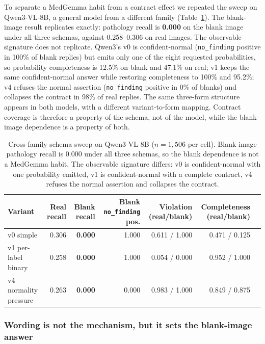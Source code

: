 To separate a MedGemma habit from a contract effect we repeated the sweep on Qwen3-VL-8B, a general model from a different family (Table~\ref{tab:r2xfamily}). The blank-image result replicates exactly: pathology recall is \textbf{0.000} on the blank image under all three schemas, against 0.258--0.306 on real images. The observable signature does not replicate. Qwen3's v0 is confident-normal (\texttt{no\_finding} positive in 100\% of blank replies) but emits only one of the eight requested probabilities, so probability completeness is 12.5\% on blank and 47.1\% on real; v1 keeps the same confident-normal answer while restoring completeness to 100\% and 95.2\%; v4 refuses the normal assertion (\texttt{no\_finding} positive in 0\% of blanks) and collapses the contract in 98\% of real replies. The same three-form structure appears in both models, with a different variant-to-form mapping. Contract coverage is therefore a property of the schema, not of the model, while the blank-image dependence is a property of both.

\begin{table}[t]
\centering
\footnotesize
\setlength{\tabcolsep}{3.5pt}
\caption{Cross-family schema sweep on Qwen3-VL-8B ($n=1{,}506$ per cell). Blank-image pathology recall is 0.000 under all three schemas, so the blank dependence is not a MedGemma habit. The observable signature differs: v0 is confident-normal with one probability emitted, v1 is confident-normal with a complete contract, v4 refuses the normal assertion and collapses the contract.}
\label{tab:r2xfamily}
\begin{tabular}{lrrrrrr}
\toprule
Variant & Real recall & Blank recall & Blank \texttt{no\_finding} pos. & Violation (real/blank) & Completeness (real/blank) \\
\midrule
v0 simple & 0.306 & \textbf{0.000} & 1.000 & 0.611 / 1.000 & 0.471 / 0.125 \\
v1 per-label binary & 0.258 & \textbf{0.000} & 1.000 & 0.054 / 0.000 & 0.952 / 1.000 \\
v4 normality pressure & 0.263 & \textbf{0.000} & 0.000 & 0.983 / 1.000 & 0.849 / 0.875 \\
\bottomrule
\end{tabular}
\end{table}

\subsubsection{Wording is not the mechanism, but it sets the blank-image answer}
\label{sec:results-paraphrase}

